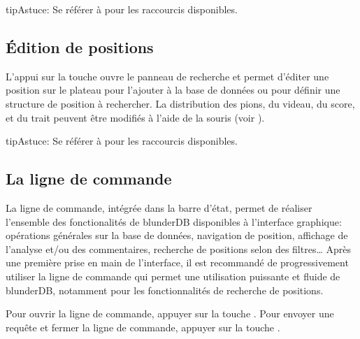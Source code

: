 \documentclass[letterpaper,10pt,french]{sphinxmanual}
\begin{document}
\begin{sphinxadmonition}{tip}{Astuce:}
\sphinxAtStartPar
Se référer à {\hyperref[\detokenize{raccourcis:raccourcis}]{}} pour les raccourcis disponibles.
\end{sphinxadmonition}


\subsection{Édition de positions}
\label{\detokenize{manuel:edition-de-positions}}\label{\detokenize{manuel:edition-positions}}
\sphinxAtStartPar
L’appui sur la touche  ouvre le panneau de recherche et permet
d’éditer une position sur le plateau pour l’ajouter à la base de données
ou pour définir une structure de position à rechercher.
La distribution des pions, du videau, du score, et du trait peuvent être
modifiés à l’aide de la souris (voir {\hyperref[\detokenize{guide_utilisateur:guide-edit-position}]{}}).

\begin{sphinxadmonition}{tip}{Astuce:}
\sphinxAtStartPar
Se référer à {\hyperref[\detokenize{raccourcis:raccourcis}]{}} pour les raccourcis disponibles.
\end{sphinxadmonition}


\subsection{La ligne de commande}
\label{\detokenize{manuel:la-ligne-de-commande}}\label{\detokenize{manuel:ligne-commande}}
\sphinxAtStartPar
La ligne de commande, intégrée dans la barre d’état, permet de réaliser
l’ensemble des fonctionalités de blunderDB disponibles à l’interface
graphique: opérations générales sur la base de données, navigation de
position, affichage de l’analyse et/ou des commentaires, recherche de
positions selon des filtres… Après une première prise en main de
l’interface, il est recommandé de progressivement utiliser la ligne de
commande qui permet une utilisation puissante et fluide de blunderDB,
notamment pour les fonctionnalités de recherche de positions.

\sphinxAtStartPar
Pour ouvrir la ligne de commande, appuyer sur
la touche . Pour envoyer une requête et fermer la ligne de
commande, appuyer sur la touche .
\end{document}
